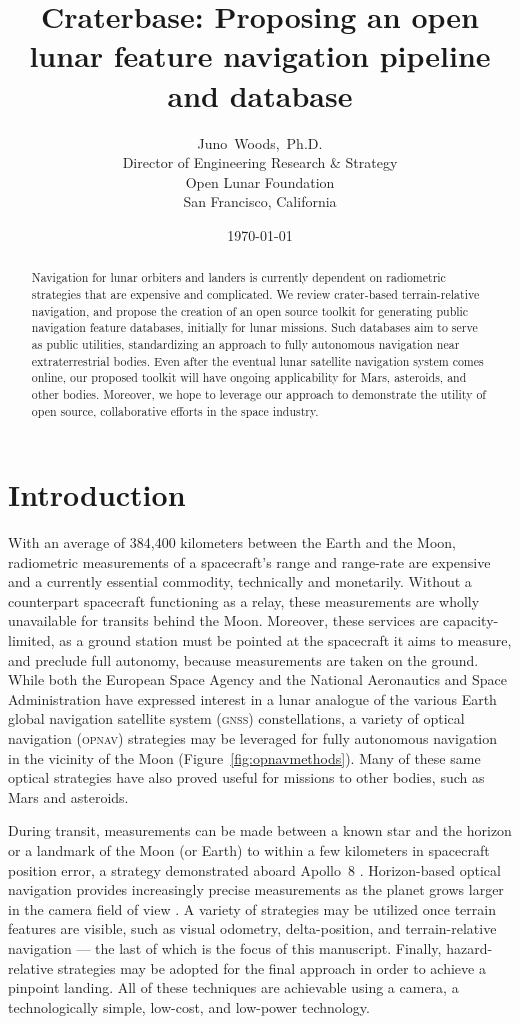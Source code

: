 \documentclass[12pt]{olfmemo}
\title{Craterbase: Proposing an open lunar feature navigation pipeline and database}
\author{
        Juno~Woods,~Ph.D. \\
        Director of Engineering Research \& Strategy\\
        Open Lunar Foundation\\
        San Francisco, California
}
\date{\today}
\begin{document}
\maketitle

\begin{abstract}
Navigation for lunar orbiters and landers is currently dependent on radiometric strategies that are expensive and complicated. We review crater-based terrain-relative navigation, and propose the creation of an open source toolkit for generating public navigation feature databases, initially for lunar missions. Such databases aim to serve as public utilities, standardizing an approach to fully autonomous navigation near extraterrestrial bodies. Even after the eventual lunar satellite navigation system comes online, our proposed toolkit will have ongoing applicability for Mars, asteroids, and other bodies. Moreover, we hope to leverage our approach to demonstrate the utility of open source, collaborative efforts in the space industry.
\end{abstract}

\section{Introduction}
With an average of 384,400 kilometers between the Earth and the Moon, radiometric measurements of a spacecraft's range and range-rate are expensive and a currently essential commodity, technically and monetarily. Without a counterpart spacecraft functioning as a relay, these measurements are wholly unavailable for transits behind the Moon. Moreover, these services are capacity-limited, as a ground station must be pointed at the spacecraft it aims to measure, and preclude full autonomy, because measurements are taken on the ground. While both the European Space Agency and the National Aeronautics and Space Administration have expressed interest in a lunar analogue of the various Earth global navigation satellite system (\textsc{gnss}) constellations, a variety of optical navigation (\textsc{opnav}) strategies may be leveraged for fully autonomous navigation in the vicinity of the Moon \citep{Christian2009} (Figure~\ref{fig:opnavmethods}). Many of these same optical strategies have also proved useful for missions to other bodies, such as Mars and asteroids.

During transit, measurements can be made between a known star and the horizon or a landmark of the Moon (or Earth) to within a few kilometers in spacecraft position error, a strategy demonstrated aboard Apollo~8 \citep{Christian2009,Hoag1976}. Horizon-based optical navigation provides increasingly precise measurements as the planet grows larger in the camera field of view \citep{Christian2016,Christian2017}. A variety of strategies may be utilized once terrain features are visible, such as visual odometry, delta-position, and terrain-relative navigation --- the last of which is the focus of this manuscript. Finally, hazard-relative strategies may be adopted for the final approach in order to achieve a pinpoint landing. All of these techniques are achievable using a camera, a technologically simple, low-cost, and low-power technology.
\end{document}
